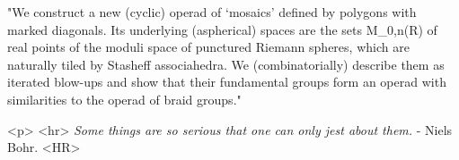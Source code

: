 "We construct a new (cyclic) operad of `mosaics' defined by polygons
with marked diagonals. Its underlying (aspherical) spaces are the sets
M_{0,n}(R) of real points of the moduli space of punctured
Riemann spheres, which are naturally tiled by Stasheff associahedra. 
We (combinatorially) describe them as iterated blow-ups and show that 
their fundamental groups form an operad with similarities to the operad 
of braid groups."

<p> <hr>
\emph{Some things are so serious that one can only jest about them.} -
Niels Bohr.
<HR>



